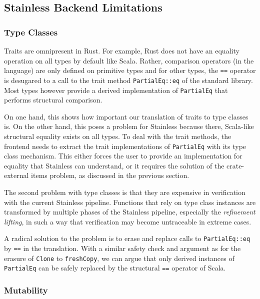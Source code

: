 \subsection{Stainless Backend Limitations}

\subsubsection{Type Classes}

Traits are omnipresent in Rust. For example, Rust does not have an
equality operation on all types by default like Scala. Rather,
comparison operators (in the language) are only defined on primitive
types and for other types, the \passthrough{\lstinline!==!} operator is
desugared to a call to the trait method
\passthrough{\lstinline!PartialEq::eq!} of the standard library. Most
types however provide a derived implementation of
\passthrough{\lstinline!PartialEq!} that performs structural comparison.

On one hand, this shows how important our translation of traits to type
classes is. On the other hand, this poses a problem for Stainless
because there, Scala-like structural equality exists on all types. To
deal with the trait methods, the frontend needs to extract the trait
implementations of \passthrough{\lstinline!PartialEq!} with its type
class mechanism. This either forces the user to provide an
implementation for equality that Stainless can understand, or it
requires the solution of the crate-external items problem, as discussed
in the previous section.

The second problem with type classes is that they are expensive in verification
with the current Stainless pipeline. Functions that rely on type class instances
are transformed by multiple phases of the Stainless pipeline, especially the
\emph{refinement lifting}, in such a way that verification may become
untraceable in extreme cases.

A radical solution to the problem is to erase and replace calls to
\passthrough{\lstinline!PartialEq::eq!} by \passthrough{\lstinline!==!}
in the translation. With a similar safety check and argument as for the
erasure of \passthrough{\lstinline!Clone!} to
\passthrough{\lstinline!freshCopy!}, we can argue that only derived
instances of \passthrough{\lstinline!PartialEq!} can be safely replaced
by the structural \passthrough{\lstinline!==!} operator of Scala.

\subsubsection{Mutability}

